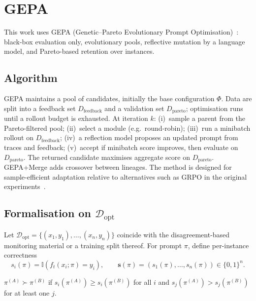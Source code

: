 \section{GEPA}
\label{sec:gepa}

This work uses GEPA (Genetic--Pareto Evolutionary Prompt Optimisation)~\cite{agrawal2025gepa}: black-box evaluation only, evolutionary pools, reflective mutation by a language model, and Pareto-based retention over instances.

\subsection{Algorithm}

GEPA maintains a pool of candidates, initially the base configuration $\Phi$. Data are split into a feedback set $D_{\mathrm{feedback}}$ and a validation set $D_{\mathrm{pareto}}$; optimisation runs until a rollout budget is exhausted. At iteration $k$: (i)~sample a parent from the Pareto-filtered pool; (ii)~select a module (e.g.\ round-robin); (iii)~run a minibatch rollout on $D_{\mathrm{feedback}}$; (iv)~a reflection model proposes an updated prompt from traces and feedback; (v)~accept if minibatch score improves, then evaluate on $D_{\mathrm{pareto}}$. The returned candidate maximises aggregate score on $D_{\mathrm{pareto}}$. GEPA+Merge adds crossover between lineages. The method is designed for sample-efficient adaptation relative to alternatives such as GRPO in the original experiments~\cite{agrawal2025gepa}.

\subsection{Formalisation on \texorpdfstring{$\mathcal{D}_{\mathrm{opt}}$}{D\_opt}}
\label{sec:formal-gepa}

Let $\mathcal{D}_{\mathrm{opt}} = \{(x_1,y_1),\dots,(x_n,y_n)\}$ coincide with the disagreement-based monitoring material or a training split thereof. For prompt $\pi$, define per-instance correctness
\begin{equation}
    s_i(\pi)=\mathbb{I}\!\left(f_t(x_i;\pi)=y_i\right),
    \qquad
    \mathbf{s}(\pi)=(s_1(\pi),\dots,s_n(\pi))\in\{0,1\}^n.
\end{equation}

\begin{definition}
$\pi^{(A)} \succ \pi^{(B)}$ if $s_i(\pi^{(A)}) \ge s_i(\pi^{(B)})$ for all $i$ and $s_j(\pi^{(A)}) > s_j(\pi^{(B)})$ for at least one $j$.
\end{definition}

